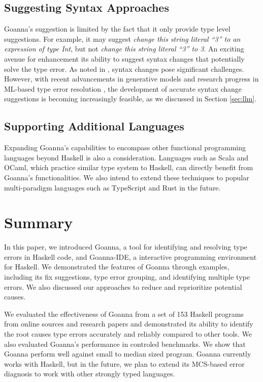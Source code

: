 \documentclass[pdflatex,sn-nature,Numbered]{sn-jnl}%
\begin{document}
\subsection{Suggesting Syntax Approaches}

Goanna's suggestion is limited by the fact that it only provide type level suggestions. For example, it may suggest {\it change this string literal ``3'' to an expression of type Int}, but not {\it change this string literal ``3'' to 3}.  An exciting avenue for enhancement its ability to suggest syntax changes that potentially solve the type error. As noted in \cite{Chen2014-dz}, syntax changes pose significant challenges. However, with recent advancements in generative models and research progress in ML-based type error resolution \cite{Seidel2017-uf}, the development of accurate syntax change suggestions is becoming increasingly feasible, as we discussed in Section \ref{sec:llm}.

\subsection{Supporting Additional Languages}

Expanding Goanna's capabilities to encompass other functional programming languages beyond Haskell is also a consideration. Languages such as Scala and OCaml, which practice similar type system to Haskell, can directly benefit from Goanna's functionalities. We also intend to extend these techniques to popular multi-paradigm languages such as TypeScript and Rust in the future.



\section{Summary} \label{sec:conclusion}

In this paper, we introduced Goanna, a tool for identifying and resolving type errors in Haskell code, and Goanna-IDE, a interactive programming environment for Haskell. We demonstrated the features of Goanna through examples, including its fix suggestions, type error grouping, and identifying multiple type errors. We also discussed our approaches to reduce and reprioritize potential causes.

We evaluated the effectiveness of Goanna from a set of 153 Haskell programs from online sources and research papers and demonstrated its ability to identify the root causes type errors accurately and reliably compared to other tools. We also evaluated Goanna's performance in controled benchmarks. We show that Goanna perform well against small to median sized program. Goanna currently works with Haskell, but in the future, we plan to extend its MCS-based error diagnosis to work with other strongly typed languages.



\end{document}
